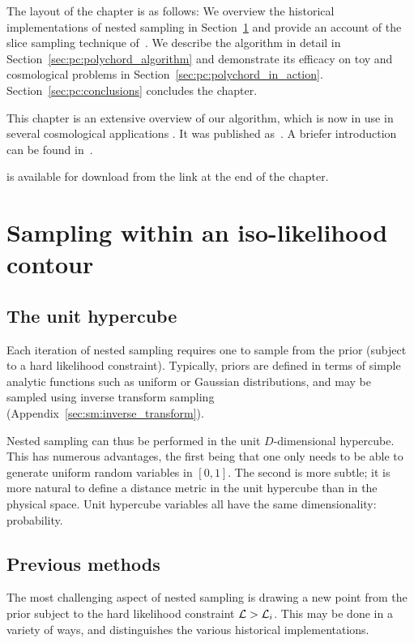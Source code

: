 The layout of the chapter is as follows:
We overview the historical implementations of nested sampling in Section~\ref{sec:pc:iso_likelihood_sampling} and provide an account of the slice sampling technique of~\cite{NealSlice}.
We describe the \PolyChord{} algorithm in detail in Section~\ref{sec:pc:polychord_algorithm} and demonstrate its efficacy on toy and cosmological problems in Section~\ref{sec:pc:polychord_in_action}.  
Section~\ref{sec:pc:conclusions} concludes the chapter.

This chapter is an extensive overview of our algorithm, which is now in use in several cosmological applications \citep{planck2015-a24}. It was published as~\cite{polychordpaper}. A briefer introduction can be found in~\cite{polychordletter}.

\PolyChord{} is available for download from the link at the end of the chapter.







\section{Sampling within an iso-likelihood contour}
\label{sec:pc:iso_likelihood_sampling}

\subsection{The unit hypercube}
\label{sec:bay:unit_hypercube}
Each iteration of nested sampling requires one to sample from the prior (subject to a hard likelihood constraint). 
Typically, priors are defined in terms of simple analytic functions such as uniform or Gaussian distributions, and may be sampled using  inverse transform sampling (Appendix~\ref{sec:sm:inverse_transform}). 

Nested sampling can thus be performed in the unit \(D\)-dimensional hypercube. This has numerous advantages, the first being that one only needs to be able to generate uniform random variables in \([0,1]\). The second is more subtle; it is more natural to define a distance metric in the unit hypercube than in the physical space. Unit hypercube variables all have the same dimensionality: probability.



\subsection{Previous methods}
\label{sec:pc:previous_methods}
The most challenging aspect of nested sampling is drawing a new point from the prior subject to the hard likelihood constraint \(\mathcal{L}>\mathcal{L}_i\). This may be done in a variety of ways, and distinguishes the various historical implementations.

